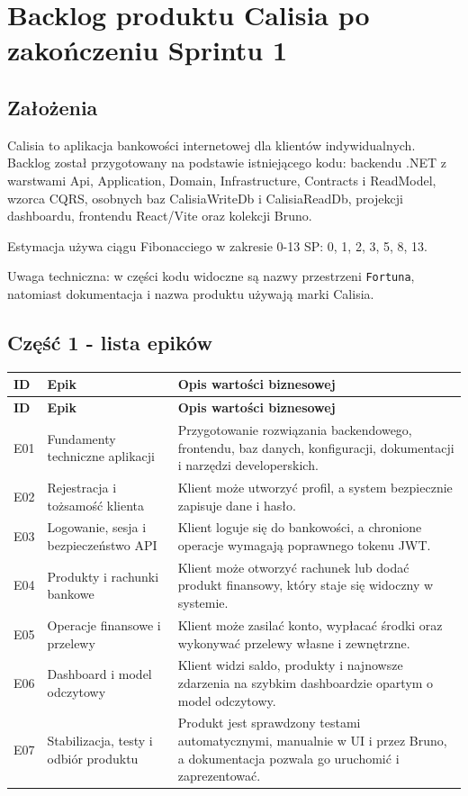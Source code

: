 \documentclass[12pt,a4paper]{article}
\begin{document}
\section*{Backlog produktu Calisia po zakończeniu Sprintu 1}

\subsection*{Założenia}

Calisia to aplikacja bankowości internetowej dla klientów indywidualnych. Backlog został przygotowany na podstawie istniejącego kodu: backendu .NET z warstwami Api, Application, Domain, Infrastructure, Contracts i ReadModel, wzorca CQRS, osobnych baz CalisiaWriteDb i CalisiaReadDb, projekcji dashboardu, frontendu React/Vite oraz kolekcji Bruno.

Estymacja używa ciągu Fibonacciego w zakresie 0-13 SP: 0, 1, 2, 3, 5, 8, 13.

Uwaga techniczna: w części kodu widoczne są nazwy przestrzeni \texttt{Fortuna}, natomiast dokumentacja i nazwa produktu używają marki Calisia.

\subsection*{Część 1 - lista epików}

\begingroup
\footnotesize
{}
\begin{longtable}{@{}L{0.10\textwidth}L{0.27\textwidth}L{0.57\textwidth}@{}}
\toprule
{}
\textbf{ID} & \textbf{Epik} & \textbf{Opis wartości biznesowej} \\
\midrule
\endfirsthead
\toprule
{}
\textbf{ID} & \textbf{Epik} & \textbf{Opis wartości biznesowej} \\
\midrule
\endhead
E01 & Fundamenty techniczne aplikacji & Przygotowanie rozwiązania backendowego, frontendu, baz danych, konfiguracji, dokumentacji i narzędzi developerskich. \\
E02 & Rejestracja i tożsamość klienta & Klient może utworzyć profil, a system bezpiecznie zapisuje dane i hasło. \\
E03 & Logowanie, sesja i bezpieczeństwo API & Klient loguje się do bankowości, a chronione operacje wymagają poprawnego tokenu JWT. \\
E04 & Produkty i rachunki bankowe & Klient może otworzyć rachunek lub dodać produkt finansowy, który staje się widoczny w systemie. \\
E05 & Operacje finansowe i przelewy & Klient może zasilać konto, wypłacać środki oraz wykonywać przelewy własne i zewnętrzne. \\
E06 & Dashboard i model odczytowy & Klient widzi saldo, produkty i najnowsze zdarzenia na szybkim dashboardzie opartym o model odczytowy. \\
E07 & Stabilizacja, testy i odbiór produktu & Produkt jest sprawdzony testami automatycznymi, manualnie w UI i przez Bruno, a dokumentacja pozwala go uruchomić i zaprezentować. \\
\bottomrule
\end{longtable}
\endgroup
\end{document}
